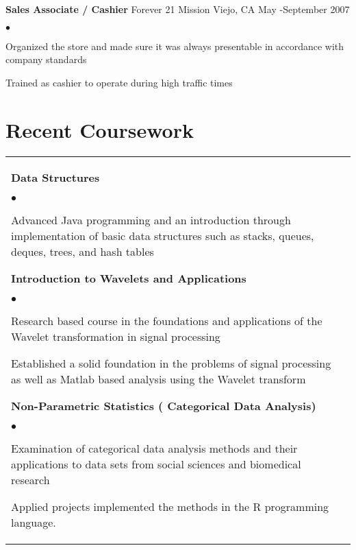 \documentclass[margin,line,pifont,palatino,courier]{res}
\newenvironment{list1}{
  \begin{list}{\ding{113}}{%
      \setlength{\itemsep}{0in}
      \setlength{\parsep}{0in} \setlength{\parskip}{0in}
      \setlength{\topsep}{0in} \setlength{\partopsep}{0in}
      \setlength{\leftmargin}{0.17in}}}{\end{list}}
\newenvironment{list2}{
  \begin{list}{$\bullet$}{%
      \setlength{\itemsep}{0in}
      \setlength{\parsep}{0in} \setlength{\parskip}{0in}
      \setlength{\topsep}{0in} \setlength{\partopsep}{0in}
      \setlength{\leftmargin}{0.2in}}}{\end{list}}
\begin{document}
\begin{resume}
\begin{list1}
\item\textbf{Sales Associate / Cashier} Forever 21 Mission Viejo, CA       May -September 2007 

\begin{list2}
\item Organized the store and made sure it was always presentable in accordance with company standards 
 \item Trained as cashier to operate during high traffic times\\

 \end{list2}
  
 



\end{list1}



\section{\sc Recent Coursework}

\begin{tabular}{@{}p{5in}p{3in}}
\begin{list1}
\item \textbf{Data Structures}  

	\begin{list2} \item Advanced Java programming and an introduction through implementation of basic data structures such as stacks, queues, deques, trees, and hash tables \end{list2} 
	
\item \textbf{Introduction to Wavelets and Applications}

		\begin{list2}\item Research based course in the foundations and applications of the Wavelet transformation in signal processing \item Established a solid foundation in the problems of signal processing as well as Matlab based analysis using the Wavelet transform \end{list2}
		
\item \textbf{Non-Parametric Statistics ( Categorical Data Analysis)}  

	\begin{list2} \item Examination of categorical data analysis methods and their applications to data sets from social sciences and biomedical research \item  Applied projects implemented the methods in the R programming language.  \end{list2}
	


\end{list1}
\end{tabular}
\end{resume}
\end{document}
